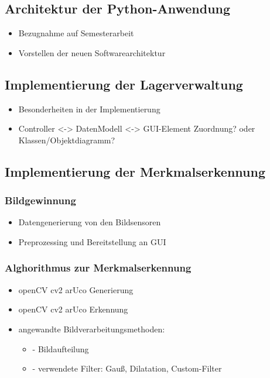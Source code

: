 \documentclass[11pt]{scrartcl}
\begin{document}
    \subsection{Architektur der Python-Anwendung}
    \begin{itemize}
        \item Bezugnahme auf Semesterarbeit
        \item Vorstellen der neuen Softwarearchitektur
    \end{itemize}

    \subsection{Implementierung der Lagerverwaltung}
    \begin{itemize}
        \item Besonderheiten in der Implementierung
        \item Controller <-> DatenModell <-> GUI-Element Zuordnung? oder Klassen/Objektdiagramm?
    \end{itemize}

    \subsection{Implementierung der Merkmalserkennung}

    \subsubsection{Bildgewinnung}
    \begin{itemize}
        \item Datengenerierung von den Bildsensoren
        \item Preprozessing und Bereitstellung an GUI
    \end{itemize}

    \subsubsection{Alghorithmus zur Merkmalserkennung}
    \begin{itemize}
        \item openCV cv2 arUco Generierung
        \item openCV cv2 arUco Erkennung
        \item angewandte Bildverarbeitungsmethoden:
        \begin{itemize}
            \item - Bildaufteilung
            \item - verwendete Filter: Gauß, Dilatation, Custom-Filter
        \end{itemize}
    \end{itemize}
\end{document}
